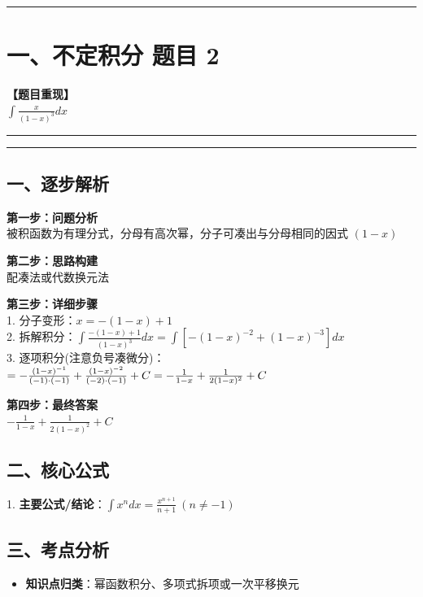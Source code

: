 ﻿\documentclass[12pt, a4paper]{ctexart}
\newcommand{\TopSeparator}{
    \par\noindent\rule{\textwidth}{1.5pt}\vspace{0.5em}
}
\newcommand{\AnalysisSeparator}{
    \par\noindent\rule{\textwidth}{0.5pt}\vspace{0.2em}\hrule\vspace{0.5em}
}
\newenvironment{RedAnalysis}{
    \par
    \color{red} 
}{
    \par
    \color{black} 
}
\begin{document}
\vspace{2em}

\TopSeparator
\section*{一、不定积分 题目 2}

\textbf{【题目重现】} \\
$\int \frac{x}{(1-x)^3} dx$

\AnalysisSeparator

\begin{RedAnalysis}

	\subsection*{一、逐步解析}

	\textbf{第一步：问题分析} \\
	被积函数为有理分式，分母有高次幂，分子可凑出与分母相同的因式 $(1-x)$

	\textbf{第二步：思路构建} \\
	配凑法或代数换元法

	\textbf{第三步：详细步骤} \\
	1. 分子变形：$x = -(1-x) + 1$ \\ 
	2. 拆解积分：$\int \frac{-(1-x)+1}{(1-x)^3} dx = \int \left[ -(1-x)^{-2} + (1-x)^{-3} \right] dx$ \\ 
	3. 逐项积分(注意负号凑微分)：$ = - \frac{(1-x)^{-1}}{(-1) \cdot (-1)} + \frac{(1-x)^{-2}}{(-2) \cdot (-1)} + C \\ = -\frac{1}{1-x} + \frac{1}{2(1-x)^2} + C$

	\textbf{第四步：最终答案} \\
	$-\frac{1}{1-x} + \frac{1}{2(1-x)^2} + C$

	\subsection*{二、核心公式}
	1. \textbf{主要公式/结论}：$\int x^n dx = \frac{x^{n+1}}{n+1} \ (n \neq -1)$

	\subsection*{三、考点分析}
	\begin{itemize}
		\item \textbf{知识点归类}：幂函数积分、多项式拆项或一次平移换元
	\end{itemize}

\end{RedAnalysis}
\end{document}
